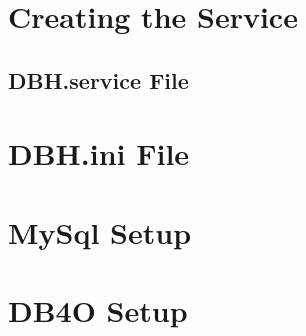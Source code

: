 \documentclass[letterpaper]{report}
\begin{document}
	\chapter{Creating the Service}
	
	\section{DBH.service File}
	\chapter{DBH.ini File}
	\chapter{MySql Setup}
	\chapter{DB4O Setup}	
\end{document}
